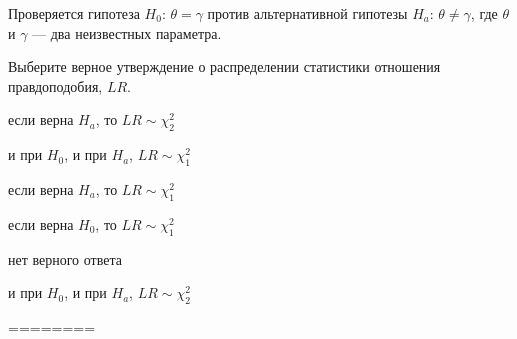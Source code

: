 
\begin{question}
Проверяется гипотеза \(H_0\): \(\theta = \gamma\) против альтернативной
гипотезы \(H_a\): \(\theta \neq \gamma\), где \(\theta\) и \(\gamma\)
--- два неизвестных параметра.

Выберите верное утверждение о распределении статистики отношения
правдоподобия, \(LR\).
\begin{answerlist}
  \item если верна \(H_a\), то \(LR \sim \chi_2^2\)
  \item и при \(H_0\), и при \(H_a\), \(LR \sim \chi_1^2\)
  \item если верна \(H_a\), то \(LR \sim \chi_1^2\)
  \item если верна \(H_0\), то \(LR \sim \chi_1^2\)
  \item нет верного ответа
  \item и при \(H_0\), и при \(H_a\), \(LR \sim \chi_2^2\)
\end{answerlist}
\end{question}

\begin{solution}
========
\end{solution}

